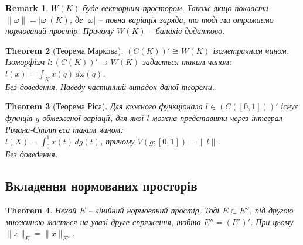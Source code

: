 \documentclass[a4paper, 10pt]{article}
\theoremstyle{theoremdd}
\newtheorem{theorem}{Theorem}[subsection]
\theoremstyle{theoremdd}
\theoremstyle{theoremdd}
\theoremstyle{theoremdd}
\theoremstyle{theoremdd}
\theoremstyle{theoremdd}
\newtheorem{remark}[theorem]{Remark}
\theoremstyle{theoremdd}
\theoremstyle{theoremdd}
\begin{document}
\begin{remark}
$W(K)$ буде векторним простором. Також якщо покласти $\|\omega\| = |\omega|(K)$, де $|\omega|$ -- повна варіація заряда, то тоді ми отримаємо нормований простір. Причому $W(K)$ -- банахів додатково.
\end{remark}

\begin{theorem}[Теорема Маркова]
$(C(K))' \cong W(K)$ ізометричним чином. Ізоморфізм $l \colon (C(K))' \to W(K)$ задається таким чином:\\
$l(x) = \displaystyle\int_K x(q)\,d\omega(q)$.\\
\textit{Без доведення. Наведу частинний випадок даної теореми.}
\end{theorem}

\begin{theorem}[Теорема Ріса]
Для кожного функціонала $l \in (C([0,1]))'$ існує фукнція $g$ обмеженої варіації, для якої $l$ можна представити через інтеграл Рімана-Стілт'єса таким чином:\\
$l(X) = \displaystyle\int_0^1 x(t)\,dg(t)$, причому $V(g;[0,1]) = \|l\|$.\\
\textit{Без доведення}.
\end{theorem}

\subsection{Вкладення нормованих просторів}
\begin{theorem}
Нехай $E$ -- лінійний нормований простір. Тоді $E \subset E''$, під другою множиною мається на увазі друге спряження, тобто $E'' = (E')'$. При цьому $\|x\|_E = \|x\|_{E''}$.
\end{theorem}
\end{document}
